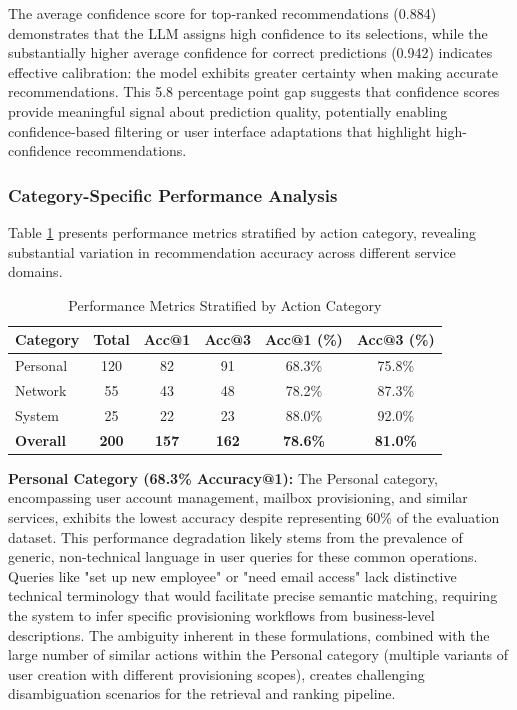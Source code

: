 The average confidence score for top-ranked recommendations (0.884) demonstrates that the LLM assigns high confidence to its selections, while the substantially higher average confidence for correct predictions (0.942) indicates effective calibration: the model exhibits greater certainty when making accurate recommendations. This 5.8 percentage point gap suggests that confidence scores provide meaningful signal about prediction quality, potentially enabling confidence-based filtering or user interface adaptations that highlight high-confidence recommendations.

\subsubsection{Category-Specific Performance Analysis}

Table \ref{tab:category_metrics} presents performance metrics stratified by action category, revealing substantial variation in recommendation accuracy across different service domains.

\begin{table}[htbp]
\centering
\begin{tabular}{lccccc}
\toprule
\textbf{Category} & \textbf{Total} & \textbf{Acc@1} & \textbf{Acc@3} & \textbf{Acc@1 (\%)} & \textbf{Acc@3 (\%)} \\
\midrule
Personal & 120 & 82 & 91 & 68.3\% & 75.8\% \\
Network  & 55  & 43 & 48 & 78.2\% & 87.3\% \\
System   & 25  & 22 & 23 & 88.0\% & 92.0\% \\
\midrule
\textbf{Overall} & \textbf{200} & \textbf{157} & \textbf{162} & \textbf{78.6\%} & \textbf{81.0\%} \\
\bottomrule
\end{tabular}
\caption{Performance Metrics Stratified by Action Category}
\label{tab:category_metrics}
\end{table}

\textbf{Personal Category (68.3\% Accuracy@1):} The Personal category, encompassing user account management, mailbox provisioning, and similar services, exhibits the lowest accuracy despite representing 60\% of the evaluation dataset. This performance degradation likely stems from the prevalence of generic, non-technical language in user queries for these common operations. Queries like "set up new employee" or "need email access" lack distinctive technical terminology that would facilitate precise semantic matching, requiring the system to infer specific provisioning workflows from business-level descriptions. The ambiguity inherent in these formulations, combined with the large number of similar actions within the Personal category (multiple variants of user creation with different provisioning scopes), creates challenging disambiguation scenarios for the retrieval and ranking pipeline.

